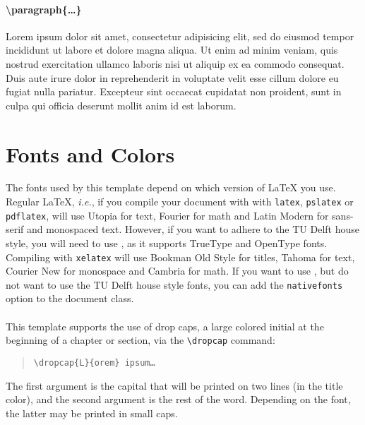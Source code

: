 \paragraph{\textbackslash paragraph\{\ldots\}}
Lorem ipsum dolor sit amet, consectetur adipisicing elit, sed do eiusmod tempor incididunt ut labore et dolore magna aliqua. Ut enim ad minim veniam, quis nostrud exercitation ullamco laboris nisi ut aliquip ex ea commodo consequat. Duis aute irure dolor in reprehenderit in voluptate velit esse cillum dolore eu fugiat nulla pariatur. Excepteur sint occaecat cupidatat non proident, sunt in culpa qui officia deserunt mollit anim id est laborum.
\section{Fonts and Colors}
The fonts used by this template depend on which version of \LaTeX{} you use. Regular \LaTeX, \emph{i.e.}, if you compile your document with with \texttt{latex}, \texttt{pslatex} or \texttt{pdflatex}, will use Utopia for text, Fourier for math and Latin Modern for sans-serif and monospaced text. However, if you want to adhere to the TU Delft house style, you will need to use \XeLaTeX, as it supports TrueType and OpenType fonts. Compiling with \texttt{xelatex} will use Bookman Old Style for titles, Tahoma for text, Courier New for monospace and Cambria for math. If you want to use \XeLaTeX, but do not want to use the TU Delft house style fonts, you can add the \texttt{nativefonts} option to the document class.\\\\
This template supports the use of drop caps, a large colored initial at the beginning of a chapter or section, via the \texttt{\textbackslash dropcap} command:
\begin{quote}
\texttt{\textbackslash dropcap\{L\}\{orem\} ipsum\ldots}
\end{quote}
The first argument is the capital that will be printed on two lines (in the title color), and the second argument is the rest of the word. Depending on the font, the latter may be printed in small caps.

